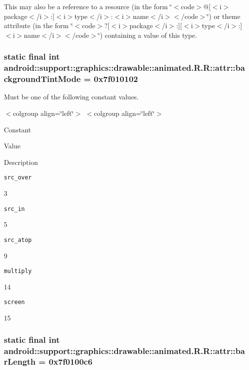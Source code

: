 This may also be a reference to a resource (in the form \char`\"{}$<$code$>$@\mbox{[}$<$i$>$package$<$/i$>$:\mbox{]}$<$i$>$type$<$/i$>$:$<$i$>$name$<$/i$>$$<$/code$>$\char`\"{}) or theme attribute (in the form \char`\"{}$<$code$>$?\mbox{[}$<$i$>$package$<$/i$>$:\mbox{]}\mbox{[}$<$i$>$type$<$/i$>$:\mbox{]}$<$i$>$name$<$/i$>$$<$/code$>$\char`\"{}) containing a value of this type. \hypertarget{classandroid_1_1support_1_1graphics_1_1drawable_1_1animated_1_1_r_1_1attr_ac01bea54caa7ec5ab045ba11322401e}{
\subsubsection[{backgroundTintMode}]{\setlength{\rightskip}{0pt plus 5cm}static final int android::support::graphics::drawable::animated.R.R::attr::backgroundTintMode = 0x7f010102}}
\label{classandroid_1_1support_1_1graphics_1_1drawable_1_1animated_1_1_r_1_1attr_ac01bea54caa7ec5ab045ba11322401e}


Must be one of the following constant values. \begin{TabularC}{0}
\hline
\end{TabularC}
$<$colgroup align=\char`\"{}left\char`\"{}$>$ $<$colgroup align=\char`\"{}left\char`\"{}$>$ 

Constant

Value

Description 

{\tt src\_\-over}

3

{\tt src\_\-in}

5

{\tt src\_\-atop}

9

{\tt multiply}

14

{\tt screen}

15\hypertarget{classandroid_1_1support_1_1graphics_1_1drawable_1_1animated_1_1_r_1_1attr_a2749e12d7418b586c94fb6de3b47193}{
\subsubsection[{barLength}]{\setlength{\rightskip}{0pt plus 5cm}static final int android::support::graphics::drawable::animated.R.R::attr::barLength = 0x7f0100c6}}
\label{classandroid_1_1support_1_1graphics_1_1drawable_1_1animated_1_1_r_1_1attr_a2749e12d7418b586c94fb6de3b47193}


